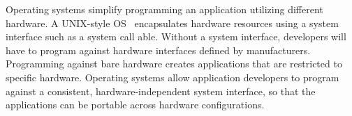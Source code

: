 \label{chap:intro}

Operating systems simplify programming an application utilizing different hardware.
A UNIX-style OS~\cite{ritchie74unix}
encapsulates hardware resources using a system interface such as a system call able.
Without a system interface,
developers will have to program against hardware interfaces defined by manufacturers.
Programming against bare hardware
creates applications that are restricted to 
specific hardware.
Operating systems allow application developers to program against a consistent, hardware-independent
system interface, %
so that the applications can be portable
across hardware configurations.













